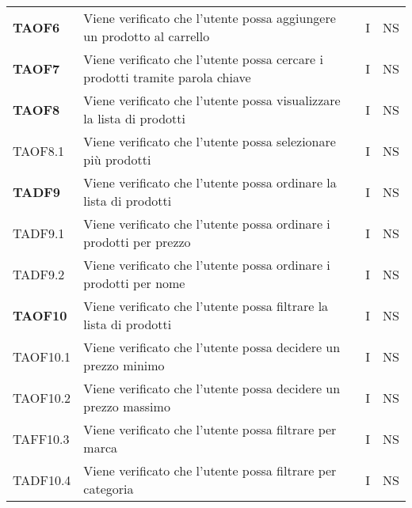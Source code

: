 \begin{center}
\begin{longtable}[!h]{p{60px} p{240px} p{35px} p{35px}}
        \textbf{TAOF6}  & Viene verificato che l'utente possa aggiungere un prodotto al carrello                                               & I             & NS              \\
        \textbf{TAOF7}  & Viene verificato che l'utente possa cercare i prodotti tramite parola chiave                                         & I             & NS              \\
        \textbf{TAOF8}  & Viene verificato che l'utente possa visualizzare la lista di prodotti                                                & I             & NS              \\
        TAOF8.1         & Viene verificato che l'utente possa selezionare più prodotti                                                         & I             & NS              \\
        \textbf{TADF9}  & Viene verificato che l'utente possa ordinare la lista di prodotti                                                    & I             & NS              \\
        TADF9.1         & Viene verificato che l'utente possa ordinare i prodotti per prezzo                                                   & I             & NS              \\
        TADF9.2         & Viene verificato che l'utente possa ordinare i prodotti per nome                                                     & I             & NS              \\
        \textbf{TAOF10} & Viene verificato che l'utente possa filtrare la lista di prodotti                                                    & I             & NS              \\
        TAOF10.1        & Viene verificato che l'utente possa decidere un prezzo minimo                                                        & I             & NS              \\
        TAOF10.2        & Viene verificato che l'utente possa decidere un prezzo massimo                                                       & I             & NS              \\
        TAFF10.3        & Viene verificato che l'utente possa filtrare per marca                                                               & I             & NS              \\
        TADF10.4        & Viene verificato che l'utente possa filtrare per categoria                                                           & I             & NS              \\

\end{longtable}
\end{center}
